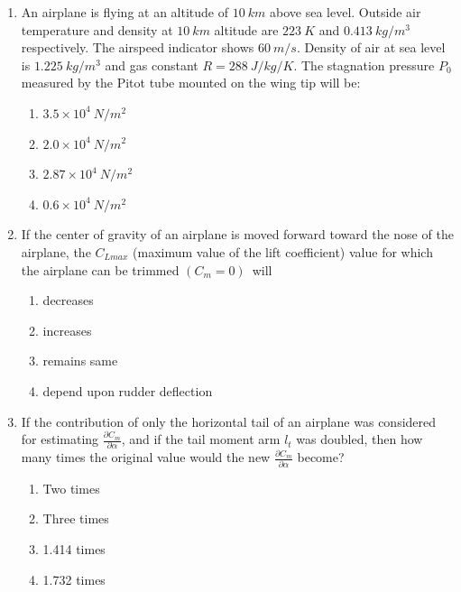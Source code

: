 \documentclass{article}
\begin{document}
\begin{enumerate}
    \item An airplane is flying at an altitude of $10\ km$ above sea level. Outside air temperature and density at $10\ km$ altitude are $223\ K$ and $0.413\ kg/m^3$ respectively. The airspeed indicator shows $60\ m/s$. Density of air at sea level is $1.225\ kg/m^3$ and gas constant $R = 288\ J/kg/K$. The stagnation pressure $P_0$ measured by the Pitot tube mounted on the wing tip will be:
    \begin{multicols}{4}
    \begin{enumerate}
        \item $3.5 \times 10^4\ N/m^2$
        \item $2.0 \times 10^4\ N/m^2$
        \item $2.87 \times 10^4\ N/m^2$
        \item $0.6 \times 10^4\ N/m^2$
    \end{enumerate}
    \end{multicols}

    \item If the center of gravity of an airplane is moved forward toward the nose of the airplane, the $C_{Lmax}$ (maximum value of the lift coefficient) value for which the airplane can be trimmed $(C_m = 0)$\ will
    \begin{multicols}{2}
    \begin{enumerate}
        \item decreases \quad
        \item increases \quad
        \item remains same \quad
        \item depend upon rudder deflection
    \end{enumerate}
    \end{multicols}

    \item If the contribution of only the horizontal tail of an airplane was considered for estimating $\frac{\partial C_m}{\partial \alpha}$, and if the tail moment arm $l_t$ was doubled, then how many times the original value would the new $\frac{\partial C_m}{\partial \alpha}$ become?
    \begin{multicols}{4}
    \begin{enumerate}
        \item Two times
        \item Three times
        \item 1.414 times
        \item 1.732 times
    \end{enumerate}
    \end{multicols}
        


\end{enumerate}
\end{document}
